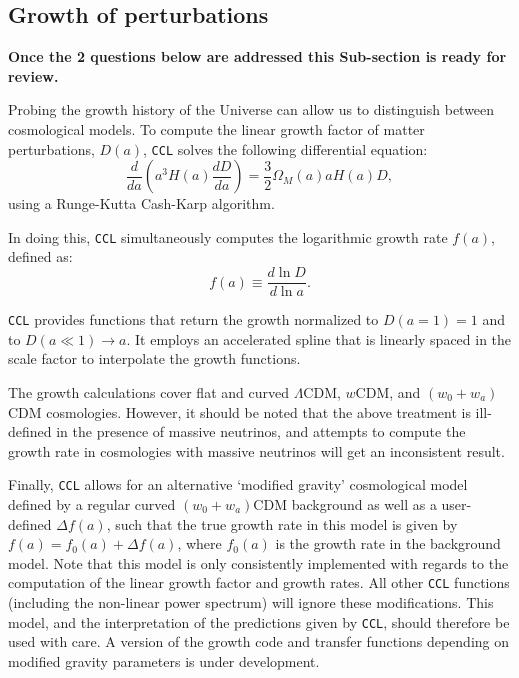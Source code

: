 \documentclass[\docopts]{\docclass}
\newcommand{\ccl}{{\tt CCL}\xspace}
\begin{document}
\subsection{Growth of perturbations}
\label{sec:growth}
{\textcolor{red!55!blue}{\bf Once the 2 questions below are addressed this Sub-section is ready for review.}}


Probing the growth history of the Universe can allow us to distinguish between cosmological models. 
To compute the linear growth factor of matter perturbations, $D(a)$, \ccl solves the following differential equation:
\begin{equation}
  \frac{d}{da}\left(a^3H(a)\frac{dD}{da}\right)=\frac{3}{2}\Omega_M(a)aH(a)D,
  \label{eq:growth}
\end{equation}
using a Runge-Kutta Cash-Karp algorithm. 

In doing this, \ccl simultaneously computes the logarithmic growth rate $f(a)$, defined as:
\begin{equation}
  f(a)\equiv \frac{d\ln D}{d\ln a}.
  \label{eq:lingrowthf}
\end{equation}

\ccl provides functions that return the growth normalized to $D(a=1)=1$ and to $D(a\ll1)\rightarrow a$. It employs an accelerated spline that is linearly spaced in the scale factor to interpolate the growth functions. 

The growth calculations cover flat and curved $\Lambda$CDM, $w$CDM, and $(w_0 + w_a)$CDM cosmologies. However, it should be noted that the above treatment is ill-defined in the presence of massive neutrinos, and attempts to compute the growth rate in cosmologies with massive neutrinos will get an inconsistent result.

Finally, \ccl allows for an alternative `modified gravity' cosmological model defined by a regular curved $(w_0+w_a)$CDM background as well as a user-defined $\Delta f(a)$, such that the true growth rate in this model is given by $f(a)=f_0(a)+\Delta f(a)$, where $f_0(a)$ is the growth rate in the background model. Note that this model is only consistently implemented with regards to the computation of the linear growth factor and growth rates.
All other \ccl functions (including the non-linear power spectrum) will ignore these modifications. This model, and the interpretation of the predictions given by \ccl, should therefore be used with care. A version of the growth code and transfer functions depending on modified gravity parameters is under development. 
\end{document}
